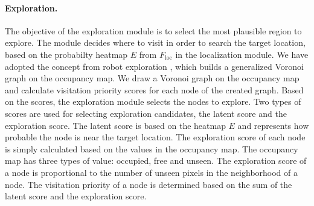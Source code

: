\documentclass[10pt,twocolumn,letterpaper]{article}
\def\proposed{RNR-Map\xspace}
\begin{document}
\paragraph{Exploration.}
%
The objective of the exploration module is to select the most plausible region to explore.
%
The module decides where to visit in order to search the target location, based on the probabilty heatmap $E$ from $F_\mathrm{loc}$ in the localization module.
We have adopted the concept from robot exploration \cite{gvg_10,gvg_14,gvg_20,gvg_99}, which builds a generalized Voronoi graph on the occupancy map.
%
We draw a Voronoi graph on the occupancy map and calculate visitation priority scores for each node of the created graph.
%
Based on the scores, the exploration module selects the nodes to explore.
%
Two types of scores are used for selecting exploration candidates, the latent score and the exploration score.
%
The latent score is based on the heatmap $E$ and represents how probable the node is near the target location.
%
The exploration score of each node is simply calculated based on the values in the occupancy map.
%
The occupancy map has three types of value: occupied, free and unseen.
%
The exploration score of a node is proportional to the number of unseen pixels in the neighborhood of a node.
%
The visitation priority of a node is determined based on the sum of the latent score and the exploration score.
\vspace{-0.3cm}
\end{document}
